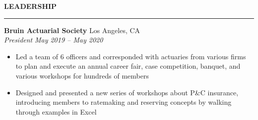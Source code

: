 \documentclass[11pt,letterpaper]{article}
\newcommand{\sectline}{\vspace{5pt}\hrule height 1.5pt\vspace{5pt}}
\newcommand{\sectspace}{\vspace{10pt}}
\begin{document}
\textbf{LEADERSHIP} \sectline
\textbf{Bruin Actuarial Society} \hfill Los Angeles, CA \\
\textit{President} \hfill \textit{May 2019 -- May 2020}
\begin{itemize}
	\item Led a team of 6 officers and corresponded with actuaries from various firms to plan and execute an annual career fair, case competition, banquet, and various workshops for hundreds of members
	\item Designed and presented a new series of workshops about P\&C insurance, introducing members to ratemaking and reserving concepts by walking through examples in Excel
\end{itemize}
\sectspace
\end{document}

